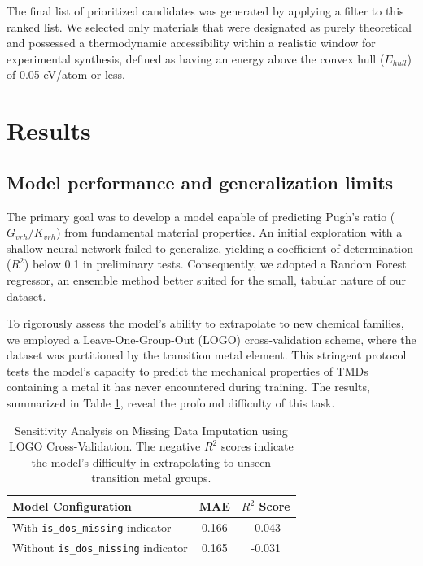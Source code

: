 \documentclass[]{article}
\begin{document}
The final list of prioritized candidates was generated by applying a filter to this ranked list. We selected only materials that were designated as purely theoretical and possessed a thermodynamic accessibility within a realistic window for experimental synthesis, defined as having an energy above the convex hull ($E_{hull}$) of 0.05 eV/atom or less.

\section{Results}
\label{sec:results}
\subsection{Model performance and generalization limits}

The primary goal was to develop a model capable of predicting Pugh's ratio ($G_{vrh}/K_{vrh}$) from fundamental material properties. An initial exploration with a shallow neural network failed to generalize, yielding a coefficient of determination ($R^2$) below 0.1 in preliminary tests. Consequently, we adopted a Random Forest regressor, an ensemble method better suited for the small, tabular nature of our dataset.

To rigorously assess the model's ability to extrapolate to new chemical families, we employed a Leave-One-Group-Out (LOGO) cross-validation scheme, where the dataset was partitioned by the transition metal element. This stringent protocol tests the model's capacity to predict the mechanical properties of TMDs containing a metal it has never encountered during training. The results, summarized in Table \ref{tab:logo_cv}, reveal the profound difficulty of this task.

\begin{table}[h!]
\centering
\caption{Sensitivity Analysis on Missing Data Imputation using LOGO Cross-Validation. The negative $R^2$ scores indicate the model's difficulty in extrapolating to unseen transition metal groups.}
\label{tab:logo_cv}
\begin{tabular}{lcc}
\hline
\hline
Model Configuration & MAE & $R^2$ Score \\
\hline
With \texttt{is\_dos\_missing} indicator & 0.166 & -0.043 \\
Without \texttt{is\_dos\_missing} indicator & 0.165 & -0.031 \\
\hline
\end{tabular}
\end{table}
\end{document}
